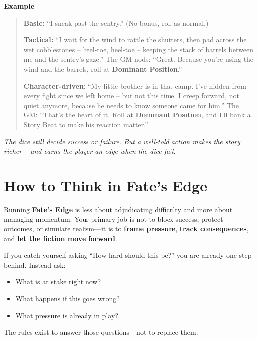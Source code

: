 \begin{tcolorbox}
\medskip
\noindent\textbf{Example}
\begin{quote}
\textbf{Basic:} ``I sneak past the sentry.'' (No bonus, roll as normal.)

\textbf{Tactical:} ``I wait for the wind to rattle the shutters, then pad across
the wet cobblestones -- heel-toe, heel-toe -- keeping the stack of barrels between
me and the sentry's gaze.''  
The GM nods: ``Great. Because you're using the wind and the barrels, roll at
\textbf{Dominant Position}.''

\textbf{Character-driven:} ``My little brother is in that camp. I've hidden from
every fight since we left home -- but not this time. I creep forward, not quiet
anymore, because he needs to know someone came for him.''  
The GM: ``That's the heart of it. Roll at \textbf{Dominant Position}, and I'll
bank a Story Beat to make his reaction matter.''
\end{quote}

\noindent
\textit{The dice still decide success or failure. But a well-told action makes
the story richer -- and earns the player an edge when the dice fall.}
\end{tcolorbox}

\section{How to Think in Fate's Edge}
\label{sec:gm-mindset}

Running \textbf{Fate's Edge} is less about adjudicating difficulty and more about managing momentum.  
Your primary job is not to block success, protect outcomes, or simulate realism---it is to \textbf{frame pressure}, \textbf{track consequences}, and \textbf{let the fiction move forward}.

If you catch yourself asking ``How hard should this be?'' you are already one step behind. Instead ask:
\begin{itemize}
\item What is at stake right now?
\item What happens if this goes wrong?
\item What pressure is already in play?
\end{itemize}
The rules exist to answer those questions---not to replace them.

